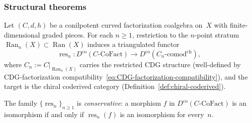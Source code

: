 \subsubsection*{Structural theorems}

\begin{theorem}
\label{thm:stratified-conservative-restriction}
Let $(C, d, h)$ be a conilpotent curved factorization coalgebra
on~$X$ with finite-dimensional graded pieces.
For each $n \geq 1$, restriction to the $n$-point stratum
$\operatorname{Ran}_n(X) \subset \operatorname{Ran}(X)$ induces a
triangulated functor
\[
\operatorname{res}_n \colon
D^{\mathrm{co}}(C\text{-}\mathrm{CoFact})
\longrightarrow
D^{\mathrm{co}}(C_n\text{-}\mathrm{comod}^{\mathrm{ch}}),
\]
where $C_n := C|_{\operatorname{Ran}_n(X)}$ carries the restricted
CDG structure \textup{(}well-defined by CDG-factorization
compatibility~\eqref{eq:CDG-factorization-compatibility}\textup{)},
and the target is the chiral coderived category
\textup{(}Definition~\textup{\ref{def:chiral-coderived})}.

The family $\{\operatorname{res}_n\}_{n \geq 1}$ is
\emph{conservative}: a morphism $f$ in
$D^{\mathrm{co}}(C\text{-}\mathrm{CoFact})$ is an isomorphism if
and only if $\operatorname{res}_n(f)$ is an isomorphism for
every~$n$.
\end{theorem}

